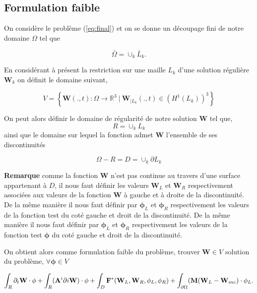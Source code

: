 \documentclass[a4paper,oneside,10pt]{report}
\begin{document}
\subsection{Formulation faible}

On considère le problème (\ref{eq:final}) et on se donne un découpage fini de notre domaine $\Omega$ tel que

\begin{equation}
\bar{\Omega} = \cup_k \bar{L}_k.
\end{equation}

En considérant à présent la restriction sur une maille $L_k$ d'une solution régulière $\mathbf{W}_k$ on définit le domaine suivant,

\begin{equation}
V = \left\{\mathbf{W}(.,t) : \Omega \rightarrow \mathbb{R}^3\ | \ \mathbf{W}_{|L_k}(.,t) \in  (H^1(L_k))^3 \right\}
\end{equation}


On peut alors définir le domaine de régularité de notre solution $\mathbf{W}$ tel que,
\begin{equation}
R = \cup_k L_k
\end{equation} 
ainsi que le domaine sur lequel la fonction admet $\mathbf{W}$ l'ensemble de ses discontinuités

\begin{equation}
\Omega - R = D = \cup_k \partial L_k
\end{equation}


\textbf{Remarque} comme la fonction $\mathbf{W}$ n'est pas continue au travers d'une surface appartenant à $D$, il nous faut définir les valeurs $\mathbf{W}_L$ et $\mathbf{W}_R$ respectivement associées aux valeurs de la fonction $\mathbf{W}$
à gauche et à droite de la discontinuité. De la même manière il nous faut définir par $\mathbf{\phi}_L$ et $\mathbf{\phi}_R$ respectivement les valeurs de la fonction test du coté gauche et droit de la discontinuité. De la même manière il nous faut définir par $\mathbf{\phi}_L$ et $\mathbf{\phi}_R$ respectivement les valeurs de la fonction test $\mathbf{\phi}$ du coté gauche et droit de la discontinuité. \\
\newline

On obtient alors comme formulation faible du problème, trouver $\mathbf{W} \in V$ solution du problème, $\forall \mathbf{\phi} \in V$

\begin{equation}
\int_R \partial_t \mathbf{W} \cdot \mathbf{\phi}+
\int_R  (\mathbf{A}^i \partial i \mathbf{W}) \cdot \mathbf{\phi}+
\int_D \mathbf{F}^*(\mathbf{W}_L,\mathbf{W}_R,\mathbf{\phi}_L,\mathbf{\phi}_R)+
\int_{\partial \Omega} (\mathbf{M}(\mathbf{W}_L - \mathbf{W}_{inc})\cdot \mathbf{\phi}_L.\\
\end{equation}
\end{document}
